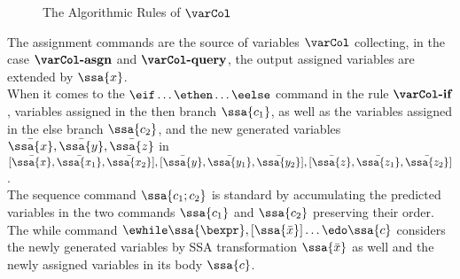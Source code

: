 \begin{figure}
 \caption{The Algorithmic Rules of $\varCol$ }
    \label{fig:var_col}
\end{figure}
%
%
The assignment commands are the source of variables $\varCol$ collecting, 
	in the case $\textbf{\varCol-asgn}$ and $\textbf{\varCol-query}$, 
	the output assigned variables are extended by $\ssa{x}$. 
\\
	When it comes to the $\eif \ldots \ethen \ldots \eelse$ command in the rule $\textbf{\varCol-if}$, variables assigned in the then branch $\ssa{c_1}$, as well as the variables assigned in the else branch $\ssa{c_2}$, and the new generated variables $\bar{\ssa{x}},\bar{\ssa{y}},\bar{\ssa{z}}$ in $ [ \bar{\ssa{x}}, \bar{\ssa{x_1}}, \bar{\ssa{x_2}}] ,[ \bar{\ssa{y}}, \bar{\ssa{y_1}}, \bar{\ssa{y_2}}],[ \bar{\ssa{z}}, \bar{\ssa{z_1}}, \bar{\ssa{z_2}}]$.
\\ 
	The sequence command $\ssa{c_1;c_2}$ is standard by accumulating the predicted variables in the two commands $\ssa{c_1}$ and $\ssa{c_2}$ preserving their order. 
\\
	The while command $\ewhile \ssa{\bexpr}, [\ssa{\bar{x}}] \ldots \edo \ssa{c}$ considers the newly generated variables by SSA transformation $\ssa{\bar{x}}$
	as well and the newly assigned variables in its body $\ssa{c}$.

